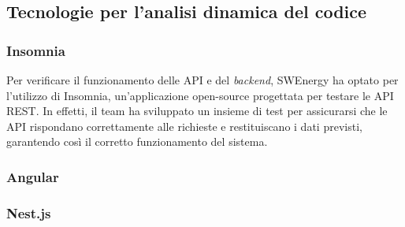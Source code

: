 \subsection{Tecnologie per l'analisi dinamica del codice}

\subsubsection{Insomnia}

Per verificare il funzionamento delle API e del \textit{backend}, SWEnergy ha
optato per l'utilizzo di Insomnia, un'applicazione open-source progettata per
testare le API REST. In effetti, il team ha sviluppato un insieme di test per
assicurarsi che le API rispondano correttamente alle richieste e restituiscano i
dati previsti, garantendo così il corretto funzionamento del sistema.


\subsubsection{Angular}

\subsubsection{Nest.js}

